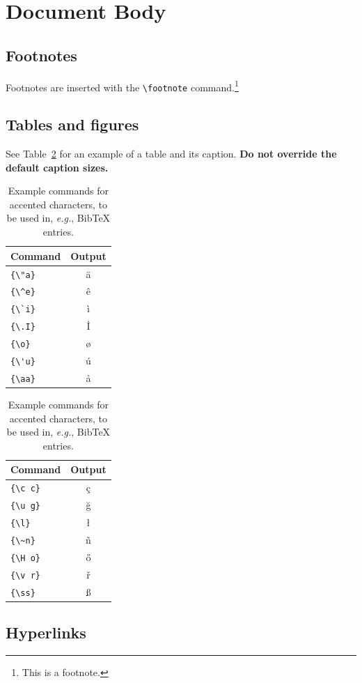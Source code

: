 \documentclass[11pt]{article}
\begin{document}
\section{Document Body}

\subsection{Footnotes}

Footnotes are inserted with the \verb|\footnote| command.\footnote{This is a footnote.}

\subsection{Tables and figures}

See Table~\ref{tab:accents} for an example of a table and its caption.
\textbf{Do not override the default caption sizes.}

\begin{table}
\centering
\begin{tabular}{lc}
\hline
\textbf{Command} & \textbf{Output}\\
\hline
\verb|{\"a}| & {\"a} \\
\verb|{\^e}| & {\^e} \\
\verb|{\`i}| & {\`i} \\ 
\verb|{\.I}| & {\.I} \\ 
\verb|{\o}| & {\o} \\
\verb|{\'u}| & {\'u}  \\ 
\verb|{\aa}| & {\aa}  \\\hline
\end{tabular}
\begin{tabular}{lc}
\hline
\textbf{Command} & \textbf{Output}\\
\hline
\verb|{\c c}| & {\c c} \\ 
\verb|{\u g}| & {\u g} \\ 
\verb|{\l}| & {\l} \\ 
\verb|{\~n}| & {\~n} \\ 
\verb|{\H o}| & {\H o} \\ 
\verb|{\v r}| & {\v r} \\ 
\verb|{\ss}| & {\ss} \\
\hline
\end{tabular}
\caption{Example commands for accented characters, to be used in, \emph{e.g.}, Bib\TeX{} entries.}
\label{tab:accents}
\end{table}

\subsection{Hyperlinks}
\end{document}

